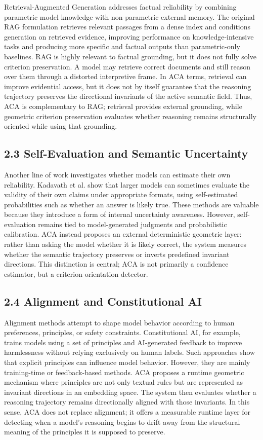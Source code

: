 \documentclass[11pt]{article}
\begin{document}
Retrieval-Augmented Generation addresses factual reliability by combining parametric model knowledge with non-parametric external memory. The original RAG formulation retrieves relevant passages from a dense index and conditions generation on retrieved evidence, improving performance on knowledge-intensive tasks and producing more specific and factual outputs than parametric-only baselines. RAG is highly relevant to factual grounding, but it does not fully solve criterion preservation. A model may retrieve correct documents and still reason over them through a distorted interpretive frame. In ACA terms, retrieval can improve evidential access, but it does not by itself guarantee that the reasoning trajectory preserves the directional invariants of the active semantic field. Thus, ACA is complementary to RAG; retrieval provides external grounding, while geometric criterion preservation evaluates whether reasoning remains structurally oriented while using that grounding.

\subsection{2.3 Self-Evaluation and Semantic Uncertainty}

Another line of work investigates whether models can estimate their own reliability. Kadavath et al. show that larger models can sometimes evaluate the validity of their own claims under appropriate formats, using self-estimated probabilities such as whether an answer is likely true. These methods are valuable because they introduce a form of internal uncertainty awareness. However, self-evaluation remains tied to model-generated judgments and probabilistic calibration. ACA instead proposes an external deterministic geometric layer: rather than asking the model whether it is likely correct, the system measures whether the semantic trajectory preserves or inverts predefined invariant directions. This distinction is central; ACA is not primarily a confidence estimator, but a criterion-orientation detector.

\subsection{2.4 Alignment and Constitutional AI}

Alignment methods attempt to shape model behavior according to human preferences, principles, or safety constraints. Constitutional AI, for example, trains models using a set of principles and AI-generated feedback to improve harmlessness without relying exclusively on human labels. Such approaches show that explicit principles can influence model behavior. However, they are mainly training-time or feedback-based methods. ACA proposes a runtime geometric mechanism where principles are not only textual rules but are represented as invariant directions in an embedding space. The system then evaluates whether a reasoning trajectory remains directionally aligned with those invariants. In this sense, ACA does not replace alignment; it offers a measurable runtime layer for detecting when a model’s reasoning begins to drift away from the structural meaning of the principles it is supposed to preserve.
\end{document}
